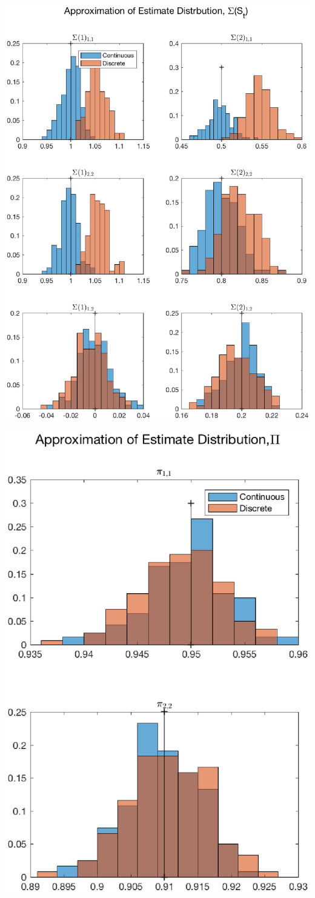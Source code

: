 \documentclass[11pt]{article}
\begin{document}
\newpage
\includegraphics{fig3}

\newpage
\includegraphics{fig4}
\end{document}
